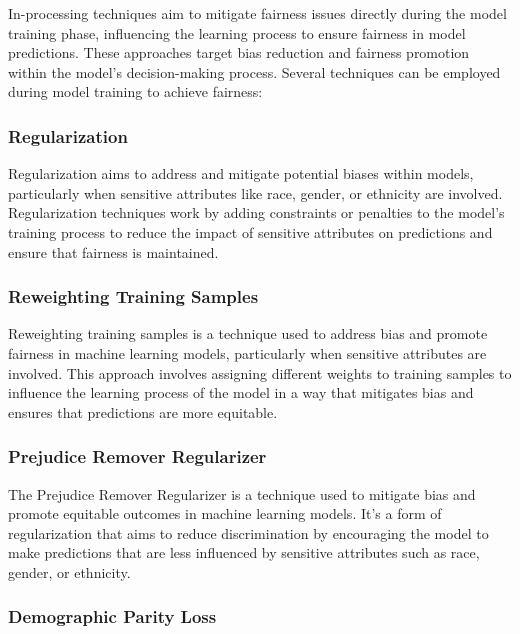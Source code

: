 \documentclass[12pt,a4paper,openright,twoside]{book}
\begin{document}
In-processing techniques aim to mitigate fairness issues directly during the model training phase, influencing the learning process to ensure fairness in model predictions. These approaches target bias reduction and fairness promotion within the model's decision-making process. Several techniques can be employed during model training to achieve fairness:

\subsubsection{Regularization}

Regularization  aims to address and mitigate potential biases within models, particularly when sensitive attributes like race, gender, or ethnicity are involved. Regularization techniques work by adding constraints or penalties to the model's training process to reduce the impact of sensitive attributes on predictions and ensure that fairness is maintained. \cite{6137441}

\subsubsection{Reweighting Training Samples}

Reweighting training samples is a technique used to address bias and promote fairness in machine learning models, particularly when sensitive attributes are involved. This approach involves assigning different weights to training samples to influence the learning process of the model in a way that mitigates bias and ensures that predictions are more equitable. \cite{10.1145/3178876.3186133}

\subsubsection{Prejudice Remover Regularizer}

The Prejudice Remover Regularizer is a technique used to mitigate bias and promote equitable outcomes in machine learning models. It's a form of regularization that aims to reduce discrimination by encouraging the model to make predictions that are less influenced by sensitive attributes such as race, gender, or ethnicity. \cite{10.1007/978-3-642-33486-3_3}

\subsubsection{Demographic Parity Loss}
\end{document}
